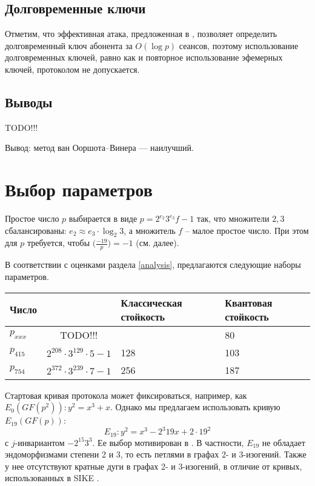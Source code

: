 \documentclass[a4paper,12pt]{article}
\theoremstyle{definition}
\begin{document}
\subsection*{Долговременные ключи}

Отметим, что эффективная атака, предложенная в \cite{sec}, позволяет определить долговременный ключ абонента за $O(\log p)$ сеансов, поэтому использование долговременных ключей,
равно как и повторное использование эфемерных ключей, протоколом не допускается.

\subsection*{Выводы}

TODO!!!

Вывод: метод ван Ооршота--Винера --- наилучший.


\section{Выбор параметров}

Простое число  $p$ выбирается в виде $p=2^{e_2}3^{e_3}f-1$ так, что множители $2,3$ сбалансированы:  $e_2\approx e_3 \cdot \log_2 3$, а множитель $f$ -- малое простое число. При этом для $p$ требуется, чтобы
$\big(\frac{-19}{p}\big) = -1$ (см. далее).

В соответствии с оценками раздела \ref{analysis}, предлагаются следующие наборы параметров. %

\begin{center}
 \begin{tabular}{|l|c|p{3cm}|p{3cm}|}
 \hline
 Число & & Классическая стойкость & Квантовая стойкость \\
 \hline
 $p_{xxx}$ & TODO!!!  &   & 80 \\
 \hline
 $p_{415}$ & $2^{208}\cdot 3^{129} \cdot 5 - 1$ & 128 & 103 \\
 \hline 
 $p_{754}$ & $2^{372} \cdot 3^{239} \cdot 7 - 1$ & 256 & 187\\
 \hline
 \end{tabular}

\end{center}

% 


Стартовая кривая протокола может фиксироваться, например, как $E_0(GF(p^2)): y^2=x^3+x$. %
Однако мы предлагаем использовать кривую   $E_{19}(GF(p))$:
\begin{equation}
E_{19}\!: y^2 = x^3 - 2^3 19 x + 2 \!\cdot\! 19^2
\end{equation}
с $j$-инвариантом $-2^{15} 3^3$. Ее выбор мотивирован в \cite{StartingCurve}. В частности,  $E_{19}$ не обладает эндоморфизмами степени 2 и 3, то есть петлями в
графах 2- и 3-изогений.  Также у  нее отсутствуют кратные дуги в графах 2- и 3-изогений, в отличие от   кривых, использованных в SIKE \cite{SIKE}.
 
\end{document}

